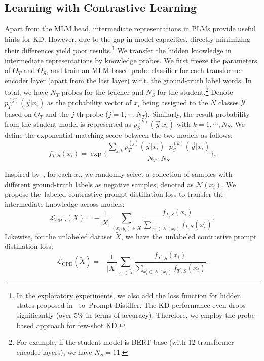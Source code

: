 \documentclass{article}
\begin{document}
\subsection{Learning with Contrastive Learning}

Apart from the MLM head, intermediate representations in PLMs provide useful hints for KD. However, due to the gap in model capacities, directly minimizing their differences yield poor results.\footnote{In the exploratory experiments, we also add the loss function for hidden states proposed in~\cite{DBLP:conf/emnlp/JiaoYSJCL0L20} to~{Prompt-Distiller}.
The KD performance even drops significantly (over 5\% in terms of accuracy). Therefore, we employ the probe-based approach for few-shot KD.}
We transfer the hidden knowledge in intermediate representations by knowledge probes.
We first freeze the parameters of ${\Theta}_{T}$ and ${\Theta}_{S}$, and train an MLM-based probe classifier for each transformer encoder layer (apart from the last layer) w.r.t. the ground-truth label words. In total, we have $N_T$ probes for the teacher and $N_S$ for the student.\footnote{For example, if the student model is BERT-base (with 12 transformer encoder layers), we have $N_S=11$.}
Denote $p_{T}^{(j)}(\vec{y}\vert x_i)$ as the probability vector of $x_i$ being assigned to the $N$ classes $\mathcal{Y}$ based on ${\Theta}_{T}$ and the $j$-th probe ($j=1,\cdots,N_T$). Similarly, the result probability from the student model is represented as $p_{S}^{(k)}(\vec{y}\vert x_i)$ with $k=1,\cdots,N_S$.
We define the exponential matching score between the two models as follows:
\begin{equation}
	f_{T,S}(x_i)=\exp\{\frac{\sum_{j,k}p_{T}^{(j)}(\vec{y}\vert x_i)\cdot p_{S}^{(k)}(\vec{y}\vert x_i)}{N_T\cdot N_S}\}.
\end{equation}


Inspired by~\cite{DBLP:journals/corr/abs-1807-03748}, for each $x_i$, we randomly select a collection of samples with different ground-truth labels as negative samples, denoted as $\mathcal{N}(x_i)$.
We propose the~{labeled contrastive prompt distillation loss} to transfer the intermediate knowledge across models:
\begin{equation}
	\mathcal{L}_{\text{CPD}}(X)=-\frac{1}{\vert X\vert}\sum_{(x_i,y_i)\in X}\frac{f_{T,S}(x_i)}{\sum_{x^{'}_i\in
		\mathcal{N}(x_i)}f_{T,S}(x^{'}_i)}.
\end{equation}
Likewise, for the unlabeled dataset $\tilde{X}$, we have the~{unlabeled contrastive prompt distillation loss}:
\begin{equation}
	\mathcal{L}_{\text{CPD}}(\tilde{X})=-\frac{1}{\vert \tilde{X}\vert}\sum_{x_i\in\tilde{X}}\frac{f_{T^{'},S}(x_i)}{\sum_{x^{'}_i\in
		\mathcal{N}(x_i)}f_{T^{'},S}(x^{'}_i)}.
\end{equation}
\end{document}
